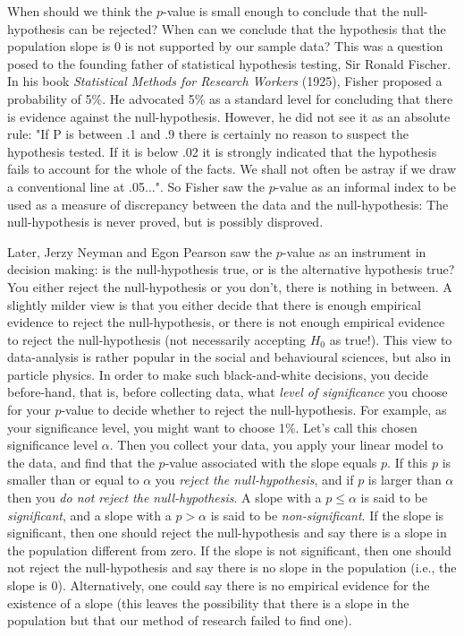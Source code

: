 \documentclass[]{report}\usepackage[]{graphicx}\usepackage[]{color}
\begin{document}
When should we think the $p$-value is small enough to conclude that the null-hypothesis can be rejected? When can we conclude that the hypothesis that the population slope is 0 is not supported by our sample data? This was a question posed to the founding father of statistical hypothesis testing, Sir Ronald Fischer. In his book \textit{Statistical Methods for Research Workers} (1925), Fisher proposed a probability of 5\%. He advocated 5\% as a standard level for concluding that there is evidence against the null-hypothesis. However, he did not see it as an absolute rule: "If P is between .1 and .9 there is certainly no reason to suspect the hypothesis tested. If it is below .02 it is strongly indicated that the hypothesis fails to account for the whole of the facts. We shall not often be astray if we draw a conventional line at .05...". So Fisher saw the $p$-value as an informal index to be used as a measure of discrepancy between the data and the null-hypothesis: The null-hypothesis is never proved, but is possibly disproved.


Later, Jerzy Neyman and Egon Pearson saw the $p$-value as an instrument in decision making: is the null-hypothesis true, or is the alternative hypothesis true? You either reject the null-hypothesis or you don't, there is nothing in between. A slightly milder view is that you either decide that there is enough empirical evidence to reject the null-hypothesis, or there is not enough empirical evidence to reject the null-hypothesis (not necessarily accepting $H_0$ as true!). This view to data-analysis is rather popular in the social and behavioural sciences, but also in particle physics. In order to make such black-and-white decisions, you decide before-hand, that is, before collecting data, what \textit{level of significance} you choose for your $p$-value to decide whether to reject the null-hypothesis. For example, as your significance level, you might want to choose 1\%. Let's call this chosen significance level $\alpha$. Then you collect your data, you apply your linear model to the data, and find that the $p$-value associated with the slope equals $p$. If this $p$ is smaller than or equal to $\alpha$ you \textit{reject the null-hypothesis}, and if $p$ is larger than $\alpha$ then you \textit{do not reject the null-hypothesis}. A slope with a $p \leq \alpha$ is said to be \textit{significant}, and a slope with a $p > \alpha$ is said to be \textit{non-significant}. If the slope is significant, then one should reject the null-hypothesis and say there is a slope in the population different from zero. If the slope is not significant, then one should not reject the null-hypothesis and say there is no slope in the population (i.e., the slope is 0). Alternatively, one could say there is no empirical evidence for the existence of a slope (this leaves the possibility that there is a slope in the population but that our method of research failed to find one).
\end{document}
